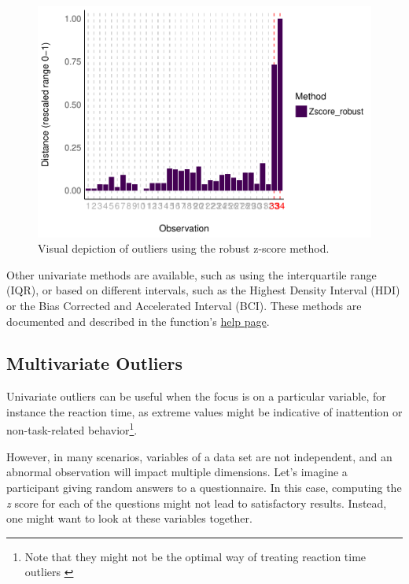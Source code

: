\documentclass[mathematics,article,submit,moreauthors,pdftex]{mdpi}
\begin{document}
\begin{figure}
\includegraphics[width=1\linewidth]{paper_files/figure-latex/univariate-1} \caption{Visual depiction of outliers using the robust z-score method.}\label{fig:univariate}
\end{figure}

Other univariate methods are available, such as using the interquartile
range (IQR), or based on different intervals, such as the Highest
Density Interval (HDI) or the Bias Corrected and Accelerated Interval
(BCI). These methods are documented and described in the function's
\href{https://easystats.github.io/performance/reference/check_outliers.html}{help
page}.

\hypertarget{multivariate-outliers}{%
\subsection{Multivariate Outliers}\label{multivariate-outliers}}

Univariate outliers can be useful when the focus is on a particular
variable, for instance the reaction time, as extreme values might be
indicative of inattention or non-task-related behavior\footnote{ Note
  that they might not be the optimal way of treating reaction time
  outliers \citep{ratcliff1993methods, van1995statistical}}.

However, in many scenarios, variables of a data set are not independent,
and an abnormal observation will impact multiple dimensions. Let's
imagine a participant giving random answers to a questionnaire. In this
case, computing the \emph{z} score for each of the questions might not
lead to satisfactory results. Instead, one might want to look at these
variables together.
\end{document}
